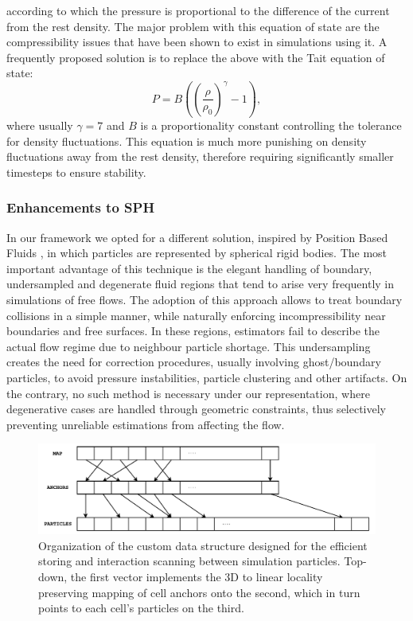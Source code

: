 \documentclass{llncs}
\begin{document}
according to which the pressure is proportional to the difference of the current from the
rest density. The major problem with this equation of state are the compressibility issues
that have been shown to exist in simulations using it. A frequently proposed solution is
to replace the above with the Tait equation of state:
\begin{equation}
  \label{eq:tait-state}
  P = B \left( \left( \frac{\rho}{\rho_0} \right)^\gamma - 1 \right),
\end{equation}
where usually $\gamma=7$ and $B$ is a proportionality constant controlling the tolerance
for density fluctuations. This equation is much more punishing on density fluctuations
away from the rest density, therefore requiring significantly smaller timesteps to ensure
stability.

\subsubsection{Enhancements to SPH} In our framework we opted for a different solution,
inspired by Position Based Fluids \cite{macklin2013position}, in which particles are
represented by spherical rigid bodies. The most important advantage of this technique is
the elegant handling of boundary, undersampled and degenerate fluid regions that tend to
arise very frequently in simulations of free flows. The adoption of this approach allows
to treat boundary collisions in a simple manner, while naturally enforcing
incompressibility near boundaries and free surfaces. In these regions, estimators fail to
describe the actual flow regime due to neighbour particle shortage. This undersampling
creates the need for correction procedures, usually involving ghost/boundary particles, to
avoid pressure instabilities, particle clustering and other artifacts. On the contrary, no
such method is necessary under our representation, where degenerative cases are handled
through geometric constraints, thus selectively preventing unreliable estimations from
affecting the flow.

\begin{figure}
  \includegraphics[width=\textwidth]{../report/figures/lp-grid.pdf}
  \caption{Organization of the custom data structure designed for the efficient storing
    and interaction scanning between simulation particles. Top-down, the first vector
    implements the 3D to linear locality preserving mapping of cell anchors onto the
    second, which in turn points to each cell's particles on the third.}
  \label{fig:lp-grid}
\end{figure}
\end{document}
